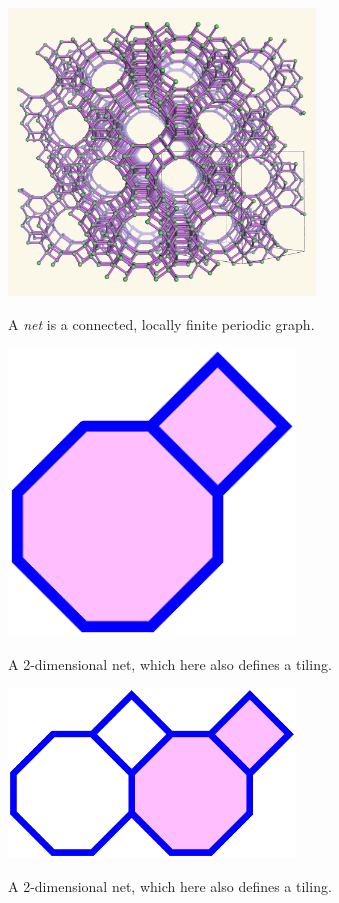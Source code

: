 \documentclass{beamer}
\begin{document}
\begin{frame}
  \begin{center}
    \includegraphics[height=3in]{fau-222}

    A {\em net} is a connected, locally finite periodic graph.
  \end{center}
\end{frame}

\begin{frame}
  \begin{center}
    \includegraphics[width=3in]{periodic1}

    A 2-dimensional net, which here also defines a tiling.
  \end{center}
\end{frame}

\begin{frame}
  \begin{center}
    \includegraphics[width=3in]{periodic2}

    A 2-dimensional net, which here also defines a tiling.
  \end{center}
\end{frame}
\end{document}
